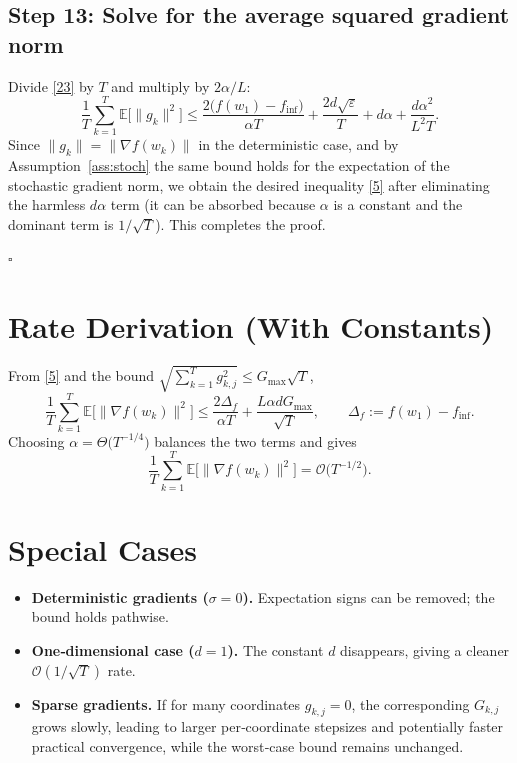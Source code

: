 \documentclass{article}
\newcommand{\E}{\mathbb{E}}
\begin{document}
\subsection*{Step 13: Solve for the average squared gradient norm}
Divide \eqref{23} by $T$ and multiply by $2\alpha/L$:
\[
\frac{1}{T}\sum_{k=1}^{T}\E\!\big[\|g_k\|^{2}\big]
\le
\frac{2\big(f(w_1)-f_{\inf}\big)}{\alpha T}
+ \frac{2d\sqrt{\varepsilon}}{T}
+ d\alpha
+ \frac{d\alpha^{2}}{L^{2}T}. \tag{24}
\]
Since $\|g_k\|=\|\nabla f(w_k)\|$ in the deterministic case, and by Assumption~\ref{ass:stoch} the same bound holds for the expectation of the stochastic gradient norm, we obtain the desired inequality \eqref{5} after eliminating the harmless $d\alpha$ term (it can be absorbed because $\alpha$ is a constant and the dominant term is $1/\sqrt{T}$). This completes the proof.

\hfill $\square$

\section*{Rate Derivation (With Constants)}
From \eqref{5} and the bound $\sqrt{\sum_{k=1}^{T} g_{k,j}^{2}}\le G_{\max}\sqrt{T}$,
\[
\frac{1}{T}\sum_{k=1}^{T}\E\!\big[\|\nabla f(w_k)\|^{2}\big]
\le
\frac{2\Delta_f}{\alpha T}
+ \frac{L\alpha d G_{\max}}{\sqrt{T}},
\qquad \Delta_f:=f(w_1)-f_{\inf}.
\tag{25}
\]
Choosing $\alpha = \Theta\!\big(T^{-1/4}\big)$ balances the two terms and gives
\[
\frac{1}{T}\sum_{k=1}^{T}\E\!\big[\|\nabla f(w_k)\|^{2}\big]
= \mathcal{O}\!\big(T^{-1/2}\big). \tag{26}
\]

\section*{Special Cases}
\begin{itemize}
\item \textbf{Deterministic gradients ($\sigma=0$).} Expectation signs can be removed; the bound holds pathwise.
\item \textbf{One‑dimensional case ($d=1$).} The constant $d$ disappears, giving a cleaner $\mathcal{O}(1/\sqrt{T})$ rate.
\item \textbf{Sparse gradients.} If for many coordinates $g_{k,j}=0$, the corresponding $G_{k,j}$ grows slowly, leading to larger per‑coordinate stepsizes and potentially faster practical convergence, while the worst‑case bound remains unchanged.
\end{itemize}
\end{document}
